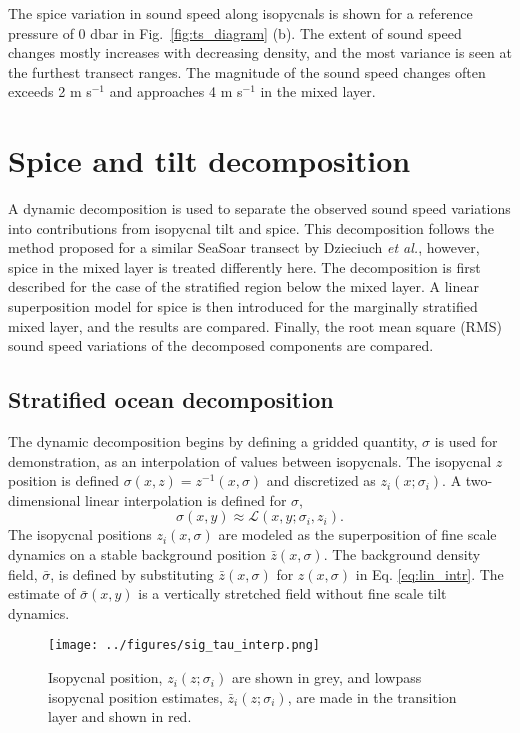 \documentclass[preprint,NumberedRefs]{JASA}
\begin{document}
The spice variation in sound speed along isopycnals is shown for a reference pressure of 0 dbar in Fig.~\ref{fig:ts_diagram} (b). The extent of sound speed changes mostly increases with decreasing density, and the most variance is seen at the furthest transect ranges. The magnitude of the sound speed changes often exceeds 2 m s$^{-1}$ and approaches 4 m s$^{-1}$ in the mixed layer.

\section{\label{sec:decomposition}Spice and tilt decomposition}
A dynamic decomposition is used to separate the observed sound speed variations into contributions from isopycnal tilt and spice. This decomposition follows the method proposed for a similar SeaSoar transect by Dzieciuch \emph{et al.},\citep{dzieciuch2004} however, spice in the mixed layer is treated differently here. The decomposition is first described for the case of the stratified region below the mixed layer. A linear superposition model for spice is then introduced for the marginally stratified mixed layer, and the results are compared. Finally, the root mean square (RMS) sound speed variations of the decomposed components are compared.

\subsection{Stratified ocean decomposition}
The dynamic decomposition begins by defining a gridded quantity, $\sigma$ is used for demonstration, as an interpolation of values between isopycnals. The isopycnal $z$ position is defined $\sigma(x, z) = z^{-1}(x, \sigma)$ and discretized as $z_i(x; \sigma_i)$. A two-dimensional linear interpolation is defined for $\sigma$,
\begin{equation}
    \sigma(x,y)\approx\mathcal{L}(x, y; \sigma_i, z_i).
    \label{eq:lin_intr}
\end{equation}
The isopycnal positions $z_i(x, \sigma)$ are modeled as the superposition of fine scale dynamics on a stable background position $\bar{z}(x, \sigma)$. The background density field, $\bar{\sigma}$, is defined by substituting $\bar{z}(x, \sigma)$ for $z(x, \sigma)$ in Eq. \eqref{eq:lin_intr}. The estimate of $\bar{\sigma}(x,y)$ is a vertically stretched field without fine scale tilt dynamics.

\begin{figure}
\texttt{[image: ../figures/sig\_tau\_interp.png]}
    \caption{\label{fig:cntrs}{Isopycnal position, $z_i(z; \sigma_i)$ are shown in grey, and lowpass isopycnal position estimates, $\bar{z}_i(z; \sigma_i)$, are made in the transition layer and shown in red.}}
\end{figure}
\end{document}
